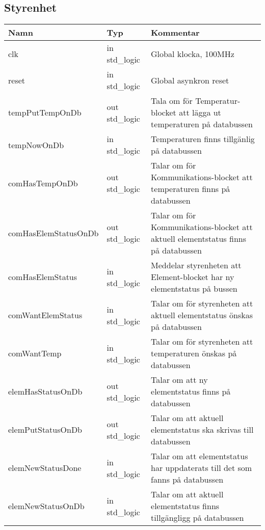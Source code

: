 \subsection{Styrenhet}
\begin{table}[H]
	\begin{tabularx}{\textwidth}{l l X}
		\hline
		\textbf{Namn} & \textbf{Typ} & \textbf{Kommentar} \\
		\hline
		clk & in std\_logic & Global klocka, 100MHz \\
		reset & in std\_logic & Global asynkron reset \\
		tempPutTempOnDb & out std\_logic & Tala om för Temperatur-blocket att lägga ut temperaturen på databussen\\
		tempNowOnDb & in std\_logic & Temperaturen finns tillgänlig på databussen\\
		comHasTempOnDb & out std\_logic & Talar om för Kommunikations-blocket att temperaturen finns på databussen\\
		comHasElemStatusOnDb & out std\_logic & Talar om för Kommunikations-blocket att aktuell elementstatus finns på databussen \\
		comHasElemStatus & in std\_logic & Meddelar styrenheten att Element-blocket har ny elementstatus på bussen\\
		comWantElemStatus & in std\_logic & Talar om för styrenheten att aktuell elementstatus önskas på databussen\\
		comWantTemp & in std\_logic & Talar om för styrenheten att temperaturen önskas på databussen \\
		elemHasStatusOnDb & out std\_logic & Talar om att ny elementstatus finns på databussen\\
		elemPutStatusOnDb & out std\_logic & Talar om att aktuell elementstatus ska skrivas till databussen\\
		elemNewStatusDone & in std\_logic & Talar om att elementstatus har uppdaterats till det som fanns på databussen\\
		elemNewStatusOnDb & in std\_logic & Talar om att aktuell elementstatus finns tillgängligg på databussen\\
		\hline
	\end{tabularx}
\end{table}
